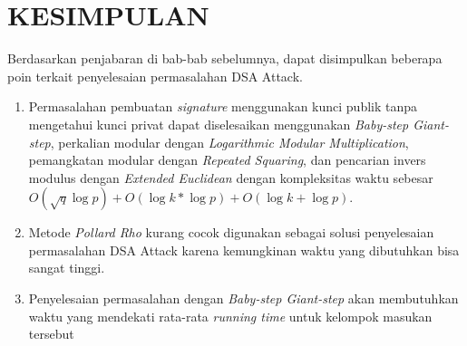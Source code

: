 \chapter{KESIMPULAN}

Berdasarkan penjabaran di bab-bab sebelumnya, dapat disimpulkan beberapa poin terkait penyelesaian permasalahan DSA Attack.
\begin{enumerate}
\item Permasalahan pembuatan \textit{signature} menggunakan kunci publik tanpa mengetahui kunci privat dapat diselesaikan menggunakan \textit{Baby-step Giant-step}, perkalian modular dengan \textit{Logarithmic Modular Multiplication}, pemangkatan modular dengan \textit{Repeated Squaring}, dan pencarian invers modulus dengan \textit{Extended Euclidean} dengan kompleksitas waktu sebesar $ O(\sqrt{q} \log p) + O (\log k * \log p) + O(\log k + \log p) $.
\item Metode \textit{Pollard Rho} kurang cocok digunakan sebagai solusi penyelesaian permasalahan DSA Attack karena kemungkinan waktu yang dibutuhkan bisa sangat tinggi.
\item Penyelesaian permasalahan dengan \textit{Baby-step Giant-step} akan membutuhkan waktu yang mendekati rata-rata \textit{running time} untuk kelompok masukan tersebut
\end{enumerate}